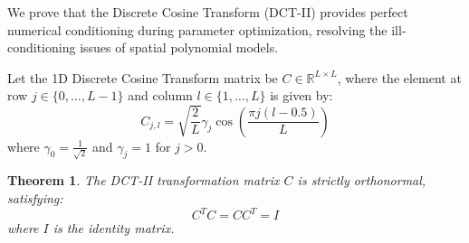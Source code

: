 \documentclass{article}
\theoremstyle{plain}
\newtheorem{theorem}{Theorem}[section]
\theoremstyle{definition}
\theoremstyle{remark}
\begin{document}
We prove that the Discrete Cosine Transform (DCT-II) provides perfect numerical conditioning during parameter optimization, resolving the ill-conditioning issues of spatial polynomial models.

Let the 1D Discrete Cosine Transform matrix be $C \in \mathbb{R}^{L \times L}$, where the element at row $j \in \{0, \dots, L-1\}$ and column $l \in \{1, \dots, L\}$ is given by:
\begin{equation}
    C_{j,l} = \sqrt{\frac{2}{L}} \gamma_j \cos\left( \frac{\pi j (l - 0.5)}{L} \right)
\end{equation}
where $\gamma_0 = \frac{1}{\sqrt{2}}$ and $\gamma_j = 1$ for $j > 0$.

\begin{theorem}
The DCT-II transformation matrix $C$ is strictly orthonormal, satisfying:
\begin{equation}
    C^T C = C C^T = I
\end{equation}
where $I$ is the identity matrix.
\end{theorem}
\end{document}
